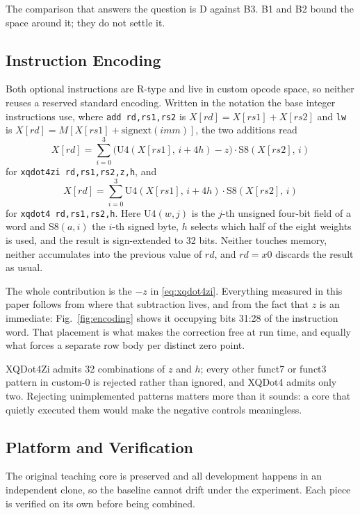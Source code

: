 The comparison that answers the question is D against B3. B1 and B2 bound the
space around it; they do not settle it.

\subsection{Instruction Encoding}
Both optional instructions are R-type and live in custom opcode space, so
neither reuses a reserved standard encoding. Written in the notation the base
integer instructions use, where \texttt{add rd,rs1,rs2} is
\(X[rd]=X[rs1]+X[rs2]\) and \texttt{lw} is
\(X[rd]=M[X[rs1]+\mathrm{signext}(\mathit{imm})]\), the two additions read
\begin{equation}
X[rd]=\sum_{i=0}^{3}\bigl(\mathrm{U4}(X[rs1],\,i{+}4h)-z\bigr)\cdot\mathrm{S8}(X[rs2],\,i)
\label{eq:xqdot4zi}
\end{equation}
for \texttt{xqdot4zi rd,rs1,rs2,z,h}, and
\begin{equation}
X[rd]=\sum_{i=0}^{3}\mathrm{U4}(X[rs1],\,i{+}4h)\cdot\mathrm{S8}(X[rs2],\,i)
\label{eq:xqdot4}
\end{equation}
for \texttt{xqdot4 rd,rs1,rs2,h}. Here \(\mathrm{U4}(w,j)\) is the \(j\)-th
unsigned four-bit field of a word and \(\mathrm{S8}(a,i)\) the \(i\)-th signed
byte, \(h\) selects which half of the eight weights is used, and the result is
sign-extended to 32 bits. Neither touches memory, neither accumulates into the
previous value of \(rd\), and \(rd=x0\) discards the result as usual.

The whole contribution is the \(-z\) in \eqref{eq:xqdot4zi}. Everything measured
in this paper follows from where that subtraction lives, and from the fact that
\(z\) is an immediate: Fig.~\ref{fig:encoding} shows it occupying bits 31:28 of
the instruction word. That placement is what makes the correction free at run
time, and equally what forces a separate row body per distinct zero point.



XQDot4Zi admits 32 combinations of \(z\) and \(h\); every other funct7 or funct3
pattern in custom-0 is rejected rather than ignored, and XQDot4 admits only two.
Rejecting unimplemented patterns matters more than it sounds: a core that
quietly executed them would make the negative controls meaningless.

\subsection{Platform and Verification}
The original teaching core is preserved and all development happens in an
independent clone, so the baseline cannot drift under the experiment. Each
piece is verified on its own before being combined.

